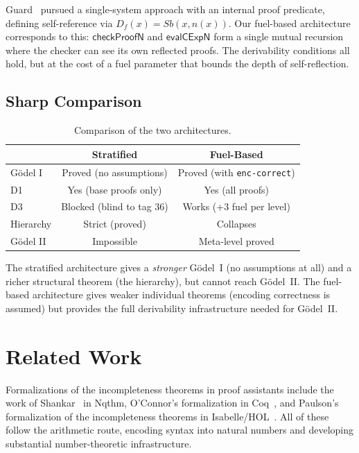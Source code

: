\documentclass[11pt]{article}
\newcommand{\evalCExpN}{\mathsf{evalCExpN}}
\newcommand{\checkProofN}{\mathsf{checkProofN}}
\begin{document}
Guard~\cite{Guard1969} pursued a single-system approach with an internal
proof predicate, defining self-reference via $D_f(x) = Sb(x, n(x))$.
Our fuel-based architecture corresponds to this: $\checkProofN$ and
$\evalCExpN$ form a single mutual recursion where the checker can see
its own reflected proofs. The derivability conditions all hold, but at
the cost of a fuel parameter that bounds the depth of self-reflection.

\subsection{Sharp Comparison}

\begin{table}[h]
\centering
\begin{tabular}{@{}lcc@{}}
\toprule
& \textbf{Stratified} & \textbf{Fuel-Based} \\
\midrule
G\"odel I & Proved (no assumptions) & Proved (with \texttt{enc-correct}) \\
D1 & Yes (base proofs only) & Yes (all proofs) \\
D3 & Blocked (blind to tag 36) & Works (+3 fuel per level) \\
Hierarchy & Strict (proved) & Collapses \\
G\"odel II & Impossible & Meta-level proved \\
\bottomrule
\end{tabular}
\caption{Comparison of the two architectures.}
\label{tab:comparison}
\end{table}

The stratified architecture gives a \emph{stronger} G\"odel~I (no
assumptions at all) and a richer structural theorem (the hierarchy), but
cannot reach G\"odel~II. The fuel-based architecture gives weaker
individual theorems (encoding correctness is assumed) but provides the
full derivability infrastructure needed for G\"odel~II.

\section{Related Work}
\label{sec:related}

Formalizations of the incompleteness theorems in proof assistants include
the work of Shankar~\cite{Shankar1994} in Nqthm, O'Connor's
formalization in Coq~\cite{OConnor2005}, and Paulson's formalization
of the incompleteness theorems in Isabelle/HOL~\cite{Paulson2015}. All
of these follow the arithmetic route, encoding syntax into natural
numbers and developing substantial number-theoretic infrastructure.
\end{document}
